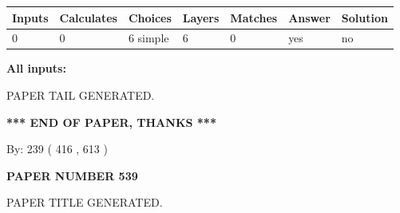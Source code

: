 \documentclass{ctexart}
\begin{document}
 
   
   
   
   
\noindent\begin{tabular}{|l|l|l|l|l|l|l|}
 \hline
Inputs & Calculates & Choices & Layers & Matches & Answer & Solution \\ \hline
 0  & 
 0  & 
 6
  simple  
  & 
 6  & 
 0  & 
  yes & 
  no 
  \\ \hline
 \end{tabular}
   
   
   
   
\noindent{}
   
   
   
   
\noindent\vspace{0.1in}\hspace{-0.08in} {\textbf{\Large{All inputs: }}}
   
   
   
   
   
   
 \vspace{0.2in}
 
   
   
\vspace{2.0in} PAPER TAIL GENERATED.
   
   
   
   
\vspace{1.0in} 
{\textbf{\large{ *** END OF PAPER, THANKS *** }}} 
   
   
\hspace{1.0in} By: 
 239 ( 416 ,  613 )
   
   
   
   
\newpage 
\setcounter{page}{ 
   539001 } 
   
   
   
   
 {\textbf{ \Large{ PAPER NUMBER  539  }}}
   
   
\vspace{0.2in}
   
   
   
   
   
   
   
   
 \vspace{0.2in}
 
 
 
 
   
   
 PAPER TITLE GENERATED.
   
\end{document}

